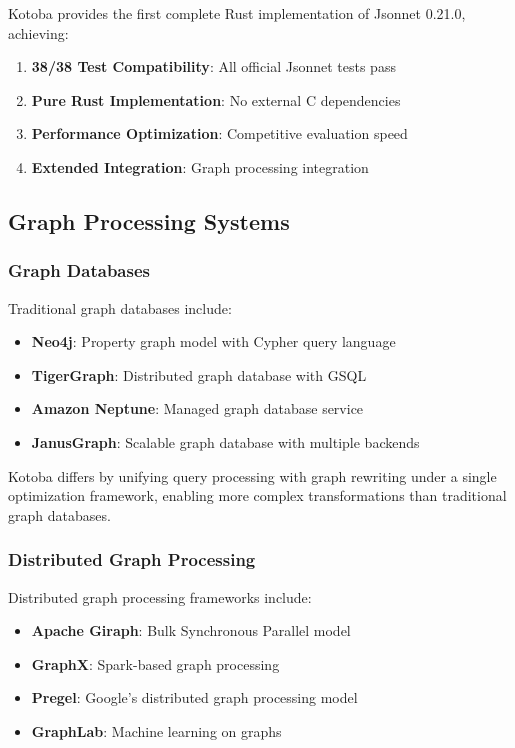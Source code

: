 \documentclass[11pt,a4paper]{article}
\begin{document}
Kotoba provides the first complete Rust implementation of Jsonnet 0.21.0, achieving:
\begin{enumerate}
\item \textbf{38/38 Test Compatibility}: All official Jsonnet tests pass
\item \textbf{Pure Rust Implementation}: No external C dependencies
\item \textbf{Performance Optimization}: Competitive evaluation speed
\item \textbf{Extended Integration}: Graph processing integration
\end{enumerate}

\subsection{Graph Processing Systems}
\label{subsec:graph_systems}

\subsubsection{Graph Databases}
\label{subsubsec:graph_databases}

Traditional graph databases include:
\begin{itemize}
\item \textbf{Neo4j}: Property graph model with Cypher query language
\item \textbf{TigerGraph}: Distributed graph database with GSQL
\item \textbf{Amazon Neptune}: Managed graph database service
\item \textbf{JanusGraph}: Scalable graph database with multiple backends
\end{itemize}

Kotoba differs by unifying query processing with graph rewriting under a single optimization framework, enabling more complex transformations than traditional graph databases.

\subsubsection{Distributed Graph Processing}
\label{subsubsec:distributed_graph}

Distributed graph processing frameworks include:
\begin{itemize}
\item \textbf{Apache Giraph}: Bulk Synchronous Parallel model
\item \textbf{GraphX}: Spark-based graph processing
\item \textbf{Pregel}: Google's distributed graph processing model
\item \textbf{GraphLab}: Machine learning on graphs
\end{itemize}
\end{document}
